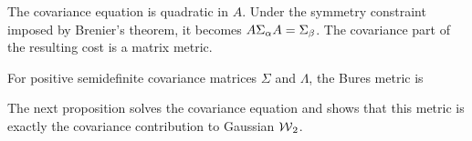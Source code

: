 The covariance equation is quadratic in $A$. Under the symmetry constraint imposed by Brenier's theorem, it becomes $A\Sigma_\alpha A=\Sigma_\beta$. The covariance part of the resulting cost is a matrix metric.

\begin{defn}\label{def-bures-metric}
	For positive semidefinite covariance matrices $\Sigma$ and $\Lambda$, the Bures metric is
\end{defn}
The next proposition solves the covariance equation and shows that this metric is exactly the covariance contribution to Gaussian $\operatorname{\mathcal{W}}_2$.

